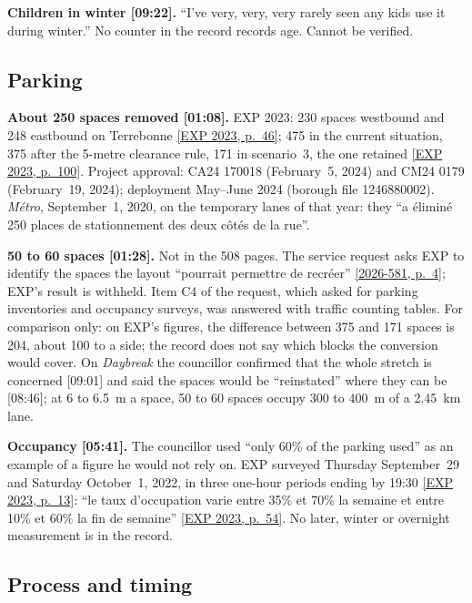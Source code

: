 \documentclass[11pt,letterpaper]{article}
\newcommand{\repourl}{https://github.com/OpenMobilityData/Terrebonne-open-sources}
\newcommand{\pagesurl}{https://openmobilitydata.github.io/Terrebonne-access-requests}
\newcommand{\cliptime}[1]{\textsf{\small[#1]}}
\newcommand{\pgl}[2]{\href{\pagesurl/2026-581/raw/01_emails_mandate_counts.pdf\#page=#1}{\textsf{\small[2026-581, p.~#2]}}}
\newcommand{\pg}[1]{\pgl{#1}{#1}}
\newcommand{\exppg}[1]{\href{\repourl/blob/main/2023-exp-mobility-study/raw/EXP_Etude_de_mobilite_rue_de_Terrebonne_2023.pdf}{\textsf{\small[EXP 2023, p.~#1]}}}
\begin{document}
\textbf{Children in winter \cliptime{09:22}.} ``I've very, very, very
rarely seen any kids use it during winter.'' No counter in the record
records age. Cannot be verified.

\subsection{Parking}

\textbf{About 250 spaces removed \cliptime{01:08}.} EXP 2023: 230 spaces
westbound and 248 eastbound on Terrebonne \exppg{46}; 475 in the current
situation, 375 after the 5-metre clearance rule, 171 in scenario~3, the one
retained \exppg{100}. Project approval: CA24 170018 (February~5, 2024) and
CM24 0179 (February~19, 2024); deployment May--June 2024 (borough file
1246880002). \emph{Métro}, September~1, 2020, on the temporary lanes of that
year: they ``a éliminé 250 places de stationnement des deux côtés de la
rue''.

\textbf{50 to 60 spaces \cliptime{01:28}.} Not in the 508 pages. The
service request asks EXP to identify the spaces the layout ``pourrait
permettre de recréer'' \pg{4}; EXP's result is withheld. Item C4 of the
request, which asked for parking inventories and occupancy surveys, was
answered with traffic counting tables. For comparison only: on EXP's
figures, the difference between 375 and 171 spaces is 204, about 100 to a
side; the record does not say which blocks the conversion would cover. On
\emph{Daybreak} the councillor confirmed that the whole stretch is
concerned \cliptime{09:01} and said the spaces would be ``reinstated''
where they can be \cliptime{08:46}; at 6 to 6.5~m a space, 50 to 60
spaces occupy 300 to 400~m of a 2.45~km lane.

\textbf{Occupancy \cliptime{05:41}.} The councillor used ``only 60\% of the
parking used'' as an example of a figure he would not rely on. EXP surveyed
Thursday September~29 and Saturday October~1, 2022, in three one-hour
periods ending by 19:30 \exppg{13}: ``le taux d'occupation varie entre 35\%
et 70\% la semaine et entre 10\% et 60\% la fin de semaine'' \exppg{54}.
No later, winter or overnight measurement is in the record.

\subsection{Process and timing}
\end{document}
